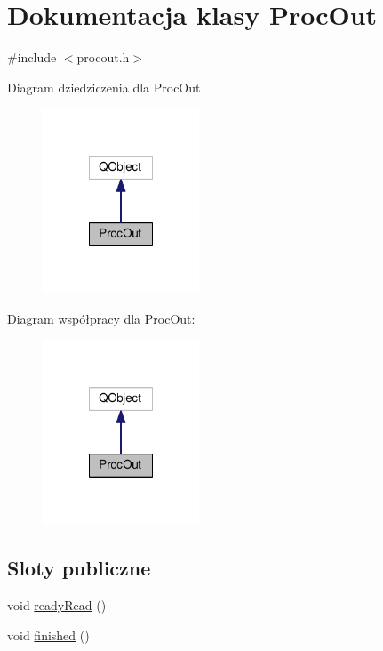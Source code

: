 \hypertarget{class_proc_out}{\section{Dokumentacja klasy Proc\-Out}
\label{class_proc_out}
}


{\ttfamily \#include $<$procout.\-h$>$}



Diagram dziedziczenia dla Proc\-Out
\nopagebreak
\begin{figure}[H]
\begin{center}
\leavevmode
\includegraphics[width=132pt]{class_proc_out__inherit__graph}
\end{center}
\end{figure}


Diagram współpracy dla Proc\-Out\-:
\nopagebreak
\begin{figure}[H]
\begin{center}
\leavevmode
\includegraphics[width=132pt]{class_proc_out__coll__graph}
\end{center}
\end{figure}
\subsection*{Sloty publiczne}
\begin{DoxyCompactItemize}
\item 
void \hyperlink{class_proc_out_a74a10fb3b6a8648f145c9520300aa6fd}{ready\-Read} ()
\item 
void \hyperlink{class_proc_out_a1217c4df45842d54c438c2d94e979c63}{finished} ()
\end{DoxyCompactItemize}
